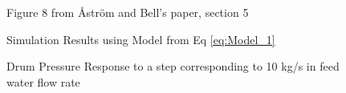         \begin{figure}[ht]
            \begin{center}
                
                Figure 8 from \r{A}str\"{o}m and Bell's paper, section 5 \cite{Astrom}
                
                
                Simulation Results using Model from Eq \eqref{eq:Model_1}
                
                \caption{Drum Pressure Response to a step corresponding to 10 kg/s in feed water flow rate}
                \label{fig:Fig8D}
            \end{center}
        \end{figure}  %
